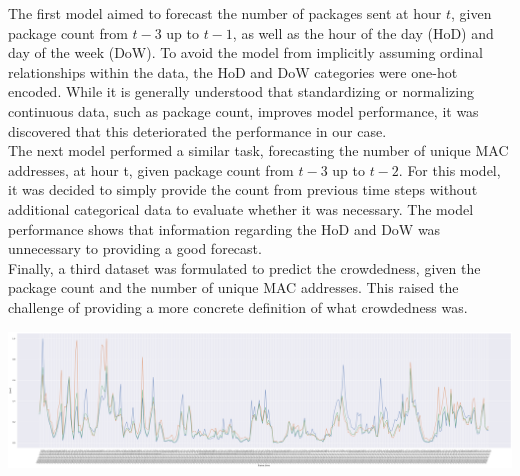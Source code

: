 \documentclass[journal, 12pt]{IEEEtran}
\begin{document}
\noindent The first model aimed to forecast the number of packages sent at hour $t$, given package count from $t-3$ up to $t-1$, as well as the hour of the day (HoD) and day of the week (DoW). To avoid the model from implicitly assuming ordinal relationships within the data, the HoD and DoW categories were one-hot encoded. While it is generally understood that standardizing or normalizing continuous data, such as package count, improves model performance, it was discovered that this deteriorated the performance in our case.\\ 

\noindent The next model performed a similar task, forecasting the number of unique MAC addresses, at hour t, given package count from $t-3$ up to $t-2$. For this model, it was decided to simply provide the count from previous time steps without additional categorical data to evaluate whether it was necessary. The model performance shows that information regarding the HoD and DoW was unnecessary to providing a good forecast. \\

\noindent Finally, a third dataset was formulated to predict the crowdedness, given the package count and the number of unique MAC addresses. This raised the challenge of providing a more concrete definition of what crowdedness was. 

\begingroup
    \center
    \medskip
    \includegraphics[width=\columnwidth]{report/final_report/images/crowedness.png}
    \label{fig:pandas_small}
    \medskip
\endgroup
\end{document}
